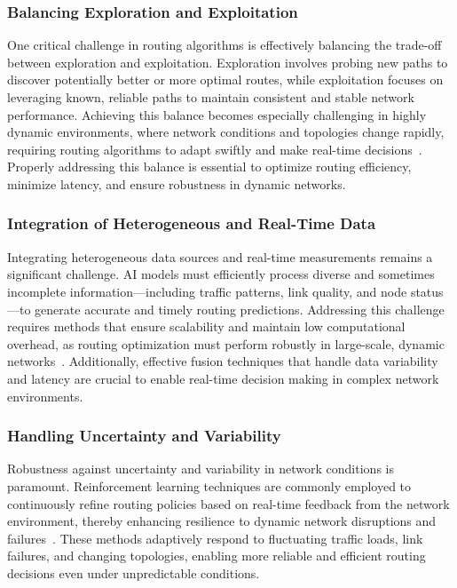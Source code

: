 \documentclass[sigconf]{acmart}
\begin{document}
\subsubsection{Balancing Exploration and Exploitation}

One critical challenge in routing algorithms is effectively balancing the trade-off between exploration and exploitation. Exploration involves probing new paths to discover potentially better or more optimal routes, while exploitation focuses on leveraging known, reliable paths to maintain consistent and stable network performance. Achieving this balance becomes especially challenging in highly dynamic environments, where network conditions and topologies change rapidly, requiring routing algorithms to adapt swiftly and make real-time decisions~\cite{}. Properly addressing this balance is essential to optimize routing efficiency, minimize latency, and ensure robustness in dynamic networks.

\subsubsection{Integration of Heterogeneous and Real-Time Data}

Integrating heterogeneous data sources and real-time measurements remains a significant challenge. AI models must efficiently process diverse and sometimes incomplete information—including traffic patterns, link quality, and node status—to generate accurate and timely routing predictions. Addressing this challenge requires methods that ensure scalability and maintain low computational overhead, as routing optimization must perform robustly in large-scale, dynamic networks~\cite{}. Additionally, effective fusion techniques that handle data variability and latency are crucial to enable real-time decision making in complex network environments.

\subsubsection{Handling Uncertainty and Variability}

Robustness against uncertainty and variability in network conditions is paramount. Reinforcement learning techniques are commonly employed to continuously refine routing policies based on real-time feedback from the network environment, thereby enhancing resilience to dynamic network disruptions and failures~\cite{}. These methods adaptively respond to fluctuating traffic loads, link failures, and changing topologies, enabling more reliable and efficient routing decisions even under unpredictable conditions.
\end{document}
